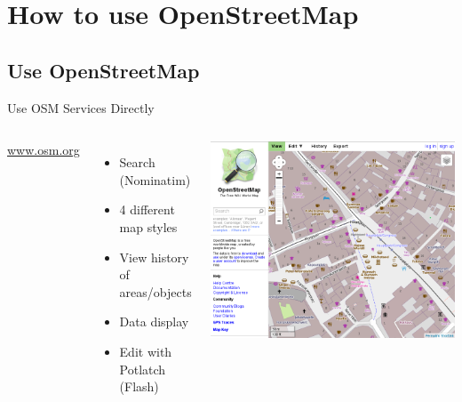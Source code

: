 \documentclass{beamer}
\begin{document}
\section{How to use OpenStreetMap}
\subsection{Use OpenStreetMap}

\begin{frame}{Use OSM Services Directly}
\begin{columns}[c] %
  \url{www.osm.org}\\

  \begin{itemize}
    \item Search (Nominatim)
    \item 4 different map styles
    \item View history of areas/objects
    \item Data display
    \item Edit with Potlatch (Flash)
  \end{itemize}

\includegraphics[width=.65\paperwidth]{osm.png}
\end{columns}
\end{frame}
\end{document}
